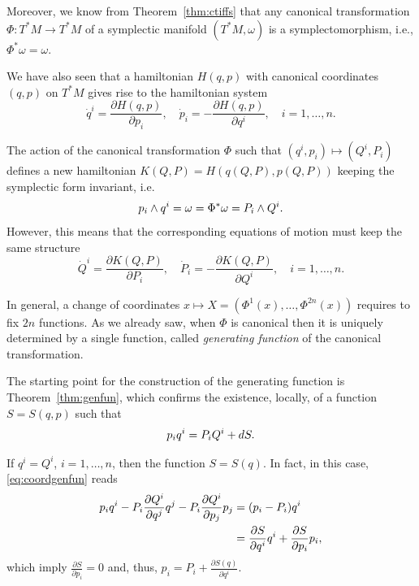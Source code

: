 \documentclass[english,fontsize=11pt,paper=a5,oneside]{scrbook}
\let\d\relax
\newcommand{\d}{\mathrm{d}}
\theoremstyle{definition}
\newenvironment{remark}
  {\pushQED{\qed}\renewcommand{\qedsymbol}{$\lozenge$}\remarkx}
  {\popQED\endremarkx}
\begin{document}
Moreover, we know from Theorem~\ref{thm:ctiffs} that any canonical transformation $\Phi:T^*M\to T^*M$ of a symplectic manifold $(T^*M,\omega)$ is a symplectomorphism, i.e., $\Phi^* \omega = \omega$.

We have also seen that a hamiltonian $H(q,p)$ with canonical coordinates $(q,p)$ on $T^*M$ gives rise to the hamiltonian system
\begin{equation}
  \dot q^i = \frac{\partial H(q,p)}{\partial p_i},\quad
  \dot p_i = -\frac{\partial H(q,p)}{\partial q^i},\quad
  i=1,\ldots,n.
\end{equation}

The action of the canonical transformation $\Phi$ such that $(q^i, p_i) \mapsto (Q^i, P_i)$ defines a new hamiltonian $K(Q,P) = H(q(Q,P), p(Q,P))$ keeping the symplectic form invariant, i.e.
\begin{equation}
  \d p_i \wedge \d q^i = \omega = \Phi^* \omega = \d P_i \wedge \d Q^i.
\end{equation}
However, this means that the corresponding equations of motion must keep the same structure
\begin{equation}
  \dot Q^i = \frac{\partial K(Q,P)}{\partial P_i},\quad
  \dot P_i = -\frac{\partial K(Q,P)}{\partial Q^i},\quad
  i=1,\ldots,n.
\end{equation}

In general, a change of coordinates $x\mapsto X=(\Phi^1(x), \ldots, \Phi^{2n}(x))$ requires to fix $2n$ functions.
As we already saw, when $\Phi$ is canonical then it is uniquely determined by a single function, called \emph{generating function} of the canonical transformation.

The starting point for the construction of the generating function is Theorem~\ref{thm:genfun}, which confirms the existence, locally, of a function $S=S(q,p)$ such that
\begin{equation}\label{eq:coordgenfun}
  p_i \d q^i = P_i \d Q^i + dS.
\end{equation}

\begin{remark}
  If $q^i = Q^i$, $i=1,\ldots,n$, then the function $S=S(q)$. In fact, in this case, \eqref{eq:coordgenfun} reads
  \begin{align}
    p_i \d q^i - P_i \frac{\partial Q^i}{\partial q^j}\d q^j - P_i \frac{\partial Q^i}{\partial p_j}\d p_j & = (p_i -P_i)\d q^i                                                               \\
                                                                                                           & = \frac{\partial S}{\partial q^i}\d q^i + \frac{\partial S}{\partial p_i}\d p_i,
  \end{align}
  which imply $\frac{\partial S}{\partial p_i} = 0$ and, thus, $p_i = P_i + \frac{\partial S(q)}{\partial q^i}$.
\end{remark}
\end{document}
